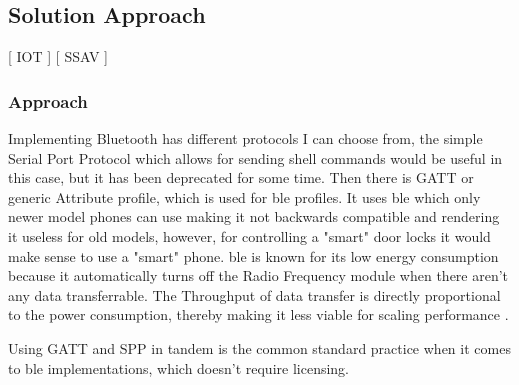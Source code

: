 \subsection{Solution Approach}
[ IOT ] [ SSAV ] 
\newline
\subsubsection{\textbf{Approach}}
 Implementing Bluetooth has different protocols I can choose from,  the simple Serial Port Protocol which allows for sending shell commands would be useful in this case, but it has been deprecated for some time. Then there is GATT \cite{BluetoothTechnologyWebsite_2023} or generic Attribute profile, which is used for \gls{ble} profiles. It uses \gls{ble} which only newer model phones can use making it not backwards compatible and rendering it useless for old models, however, for controlling a "smart" door locks it would make sense to use a "smart" phone. \gls{ble} is known for its low energy consumption because it automatically turns off the Radio Frequency module when there aren't any data transferrable. The Throughput of data transfer is directly proportional to the power consumption, thereby making it less viable for scaling performance 
 \cite{Tosi_Taffoni_Santacatterina_Sannino_Formica_2017}.
 
 Using GATT and SPP in tandem is the common standard practice when it comes to \gls{ble} implementations, which doesn't require licensing. 
 
